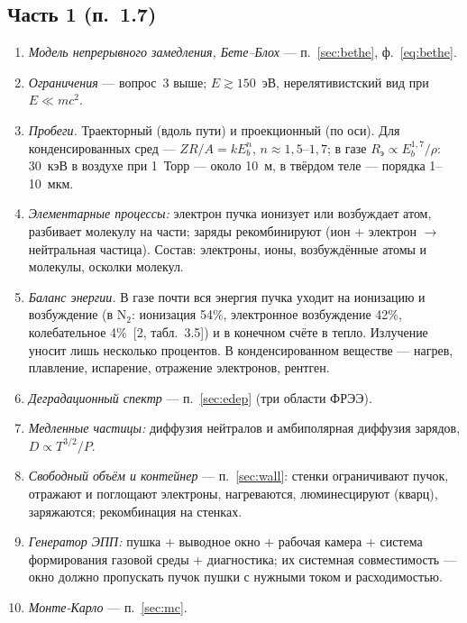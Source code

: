 \documentclass[12pt,a4paper]{article}
\newcommand{\Nt}{\mathrm{N_2}}
\begin{document}
\subsection*{Часть 1 (п.~1.7)}
\begin{enumerate}
  \item \textit{Модель непрерывного замедления, Бете--Блох} --- п.~\ref{sec:bethe},
        ф.~\eqref{eq:bethe}.
  \item \textit{Ограничения} --- вопрос~3 выше; $E \gtrsim 150$~эВ,
        нерелятивистский вид при $E \ll mc^2$.
  \item \textit{Пробеги.} Траекторный (вдоль пути) и проекционный (по
        оси). Для конденсированных сред --- $ZR/A = kE_b^n$, $n\approx1{,}5$--$1{,}7$;
        в газе $R_\text{э}\propto E_b^{1{,}7}/\rho$: 30~кэВ в воздухе при
        1~Торр --- около 10~м, в твёрдом теле --- порядка 1--10~мкм.
  \item \textit{Элементарные процессы:} электрон пучка ионизует или
        возбуждает атом, разбивает молекулу на части; заряды
        рекомбинируют (ион + электрон $\to$ нейтральная частица).
        Состав: электроны, ионы, возбуждённые атомы и молекулы,
        осколки молекул.
  \item \textit{Баланс энергии.} В газе почти вся энергия пучка уходит
        на ионизацию и возбуждение (в $\Nt$: ионизация 54\%, электронное
        возбуждение 42\%, колебательное 4\%~[2, табл.~3.5]) и в конечном
        счёте в тепло. Излучение уносит лишь несколько процентов. В
        конденсированном веществе --- нагрев, плавление, испарение,
        отражение электронов, рентген.
  \item \textit{Деградационный спектр} --- п.~\ref{sec:edep} (три области ФРЭЭ).
  \item \textit{Медленные частицы:} диффузия нейтралов и амбиполярная
        диффузия зарядов, $D \propto T^{3/2}/P$.
  \item \textit{Свободный объём и контейнер} --- п.~\ref{sec:wall}: стенки
        ограничивают пучок, отражают и поглощают электроны, нагреваются,
        люминесцируют (кварц), заряжаются; рекомбинация на стенках.
  \item \textit{Генератор ЭПП:} пушка + выводное окно + рабочая камера +
        система формирования газовой среды + диагностика; их
        системная совместимость --- окно должно пропускать пучок пушки
        с нужными током и расходимостью.
  \item \textit{Монте-Карло} --- п.~\ref{sec:mc}.
\end{enumerate}
\end{document}

